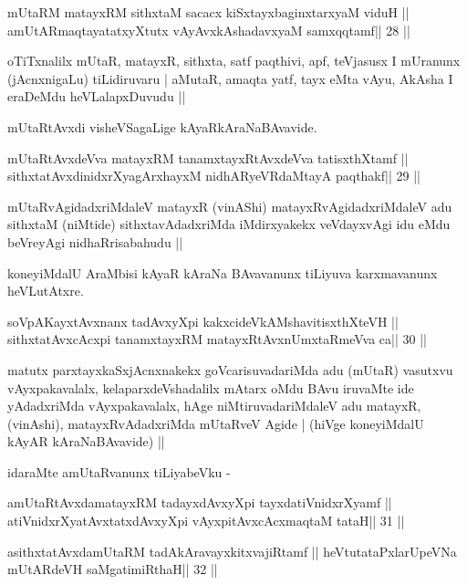 \begin{shl}
mUtaRM matayxRM sithxtaM sacacx kiSxtayxbaginxtarxyaM viduH ||
amUtARmaqtayatatxyXtutx vAyAvxkAshadavxyaM samxqqtamf\hfill || 28 ||
\end{shl}

\begin{artha}
oTiTxnalilx mUtaR, matayxR, sithxta, satf paqthivi, apf, teVjasusx I
mUranunx (jAcnxnigaLu) tiLidiruvaru | aMutaR, amaqta yatf, tayx eMta
vAyu, AkAsha I eraDeMdu heVLalapxDuvudu ||

mUtaRtAvxdi visheVSagaLige kAyaRkAraNaBAvavide.
\end{artha}

\begin{shl}
mUtaRtAvxdeVva matayxRM tanamxtayxRtAvxdeVva tatisxthXtamf ||
sithxtatAvxdinidxrXyagArxhayxM nidhARyeVRdaMtayA paqthakf\hfill || 29 ||
\end{shl}

\begin{artha}
mUtaRvAgidadxriMdaleV matayxR (vinAShi) matayxRvAgidadxriMdaleV adu
sithxtaM (niMtide) sithxtavAdadxriMda iMdirxyakekx veVdayxvAgi idu
eMdu beVreyAgi nidhaRrisabahudu ||

koneyiMdalU AraMbisi kAyaR kAraNa BAvavanunx tiLiyuva karxmavanunx heVLutAtxre.
\end{artha}

\begin{shl}
soVpAKayxtAvxnanx tadAvxyXpi kakxcideVkAMshavitisxthXteVH ||
sithxtatAvxcAcxpi tanamxtayxRM matayxRtAvxnUmxtaRmeVva ca\hfill || 30 ||
\end{shl}

\begin{artha}
matutx parxtayxkaSxjAcnxnakekx goVcarisuvadariMda adu (mUtaR) vasutxvu
vAyxpakavalalx, kelaparxdeVshadalilx mAtarx oMdu BAvu iruvaMte ide
yAdadxriMda vAyxpakavalalx, hAge niMtiruvadariMdaleV adu matayxR,
(vinAshi), matayxRvAdadxriMda mUtaRveV Agide | (hiVge koneyiMdalU
kAyAR kAraNaBAvavide) ||

idaraMte amUtaRvanunx tiLiyabeVku -
\end{artha}

\begin{shl}
amUtaRtAvxdamatayxRM tadayxdAvxyXpi tayxdatiVnidxrXyamf ||
atiVnidxrXyatAvxtatxdAvxyXpi vAyxpitAvxcAcxmaqtaM tataH\hfill || 31 ||
\end{shl}

\begin{shl}
asithxtatAvxdamUtaRM tadAkAravayxkitxvajiRtamf ||
heVtutataPxlarUpeVNa mUtARdeVH saMgatimiRthaH\hfill || 32 ||
\end{shl}

